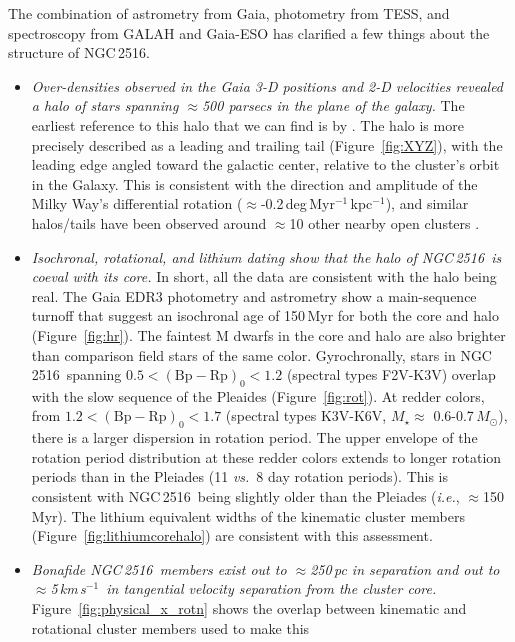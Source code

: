 \documentclass[12pt,twocolumn,tighten]{aastex63}
\newcommand{\cn}{NGC\,2516} %
\newcommand{\kms}{\,km\,s$^{-1}$}
\newcommand{\bpmrp}{(\mathrm{Bp}-\mathrm{Rp})_0}
\begin{document}
The combination of astrometry from Gaia, photometry from TESS, and
spectroscopy from GALAH and Gaia-ESO has clarified a few things about
the structure of \cn.
\begin{itemize}
  \item {\it Over-densities observed in the Gaia 3-D positions and 2-D
    velocities revealed a halo of stars spanning $\approx$500 parsecs
    in the plane of the galaxy.} The earliest reference to this halo
    that we can find is by \citet{kounkel_untangling_2019}.  The halo
    is more precisely described as a leading and trailing tail
    (Figure~\ref{fig:XYZ}), with the leading edge angled toward the
    galactic center, relative to the cluster's orbit in the Galaxy.
    This is consistent with the direction and amplitude of the Milky
    Way's differential rotation
    ($\approx$-0.2\,deg\,Myr$^{-1}$\,kpc$^{-1}$), and similar
    halos/tails have been observed around $\approx$10 other nearby
    open clusters \citep{meingast_2021}.
  \item {\it Isochronal, rotational, and lithium dating show that the
    halo of \cn\ is coeval with its core.} In short, all the data are
    consistent with the halo being real.  The Gaia EDR3 photometry and
    astrometry show a main-sequence turnoff that suggest an isochronal
    age of 150\,Myr for both the core and halo (Figure~\ref{fig:hr}).
    The faintest M dwarfs in the core and halo are also brighter than
    comparison field stars of the same color.  Gyrochronally, stars in
    \cn\ spanning $0.5<\bpmrp<1.2$ (spectral types F2V-K3V) overlap
    with the slow sequence of the Pleaides (Figure~\ref{fig:rot}).  At
    redder colors, from $1.2<\bpmrp<1.7$ (spectral types K3V-K6V,
    $M_\star$$\approx$ 0.6-0.7\,$M_\odot$), there is a larger
    dispersion in rotation period.  The upper envelope of the rotation
    period distribution at these redder colors extends to longer
    rotation periods than in the Pleiades (11 {\it vs.}\ 8 day
    rotation periods).  This is consistent with \cn\ being slightly
    older than the Pleiades ({\it i.e.}, $\approx$150\,Myr).  The
    lithium equivalent widths of the kinematic cluster members
    (Figure~\ref{fig:lithiumcorehalo}) are consistent with this
    assessment.
  \item {\it Bonafide \cn\ members exist out to $\approx$250\,pc in
    separation and out to $\approx$5\kms\ in tangential velocity
    separation from the cluster core.}
    Figure~\ref{fig:physical_x_rotn} shows the overlap between
    kinematic and rotational cluster members used to make this
$$
\end{itemize}
\end{document}
